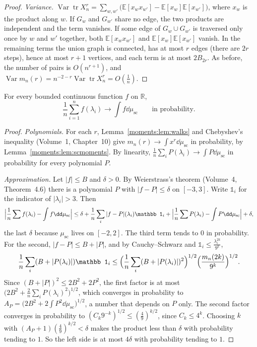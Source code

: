 \begin{proof}
\emph{Variance.} $\operatorname{Var}\operatorname{tr}X_n^r=\sum_{w,w'}\bigl(\mathbb E[x_wx_{w'}]-\mathbb E[x_w]\mathbb E[x_{w'}]\bigr)$, where $x_w$ is the product along $w$. If
$G_w$ and $G_{w'}$ share no edge, the two products are independent and the term vanishes. If some edge of $G_w\cup G_{w'}$ is traversed only once by $w$ and
$w'$ together, both $\mathbb E[x_wx_{w'}]$ and $\mathbb E[x_w]\mathbb E[x_{w'}]$ vanish. In the remaining terms the union graph is connected, has at most $r$ edges
(there are $2r$ steps), hence at most $r+1$ vertices, and each term is at most $2B_{2r}$. As before, the number of pairs is $O(n^{r+1})$, and
$\operatorname{Var}m_n(r)=n^{-2-r}\operatorname{Var}\operatorname{tr}X_n^r=O(\frac1n)$.
\end{proof}

\begin{theorem}[Wigner, 1955]\label{moments:thm:wigner}
For every bounded continuous function $f$ on $\mathbb R$,
\[
\frac1n\sum_{i=1}^nf(\lambda_i)\longrightarrow\int f\dd\mu_{\mathrm{sc}}\qquad\text{in probability.}
\]
\end{theorem}
\begin{proof}
\emph{Polynomials.} For each $r$, Lemma~\ref{moments:lem:walks} and Chebyshev's inequality (Volume~1, Chapter~10) give $m_n(r)\to\int x^r\dd\mu_{\mathrm{sc}}$ in
probability, by Lemma~\ref{moments:lem:scmoments}. By linearity, $\frac1n\sum_iP(\lambda_i)\to\int P\dd\mu_{\mathrm{sc}}$ in probability for every polynomial $P$.

\emph{Approximation.} Let $|f|\le B$ and $\delta>0$. By Weierstrass's theorem (Volume~4, Theorem~4.6) there is a polynomial $P$ with $|f-P|\le\delta$ on $[-3,3]$.
Write $\mathbb 1_i$ for the indicator of $|\lambda_i|>3$. Then
\[
\Bigl|\frac1n\sum f(\lambda_i)-\int f\dd\mu_{\mathrm{sc}}\Bigr|\le\delta+\frac1n\sum_i|f-P|(\lambda_i)\mathbb 1_i+\Bigl|\frac1n\sum P(\lambda_i)-\int P\dd\mu_{\mathrm{sc}}\Bigr|+\delta,
\]
the last $\delta$ because $\mu_{\mathrm{sc}}$ lives on $[-2,2]$. The third term tends to $0$ in probability. For the second, $|f-P|\le B+|P|$, and by
Cauchy--Schwarz and $\mathbb 1_i\le\frac{\lambda_i^{2k}}{9^k}$,
\[
\frac1n\sum_i(B+|P(\lambda_i)|)\mathbb 1_i\le\Bigl(\frac1n\sum_i(B+|P(\lambda_i)|)^2\Bigr)^{1/2}\Bigl(\frac{m_n(2k)}{9^k}\Bigr)^{1/2}.
\]
Since $(B+|P|)^2\le2B^2+2P^2$, the first factor is at most $\bigl(2B^2+\frac2n\sum_iP(\lambda_i)^2\bigr)^{1/2}$, which converges in probability to
$A_P=\bigl(2B^2+2\int P^2\dd\mu_{\mathrm{sc}}\bigr)^{1/2}$, a number that depends on $P$ only. The second factor converges in probability to $(C_k9^{-k})^{1/2}\le(\frac49)^{k/2}$,
since $C_k\le4^k$. Choosing $k$ with $(A_P+1)(\frac49)^{k/2}<\delta$ makes the product less than $\delta$ with probability tending to $1$.
So the left side is at most $4\delta$ with probability tending to $1$.
\end{proof}

